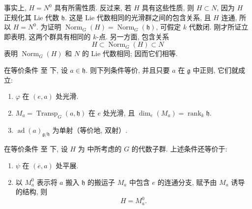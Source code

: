 事实上, \(H=N^0\) 具有所需性质. 反过来, 若 \(H\) 具有这些性质, 则 \(H\subset N\), 因为 \(H\) 正规化其 Lie 代数 \(\mathfrak h\). 这是 Lie 代数相同的光滑群之间的包含关系, 且 \(H\) 连通, 所以 \(H=N^0\). 为证明 \(\operatorname{Norm}_G(H)=\operatorname{Norm}_G(\mathfrak h)\), 可假定 \(k\) 代数闭. 刚才所证立即表明, 这两个群具有相同的 \(k\)-点. 另一方面, 包含关系
\[
  H\subset\operatorname{Norm}_G(H)\subset N
\]
表明 \(\operatorname{Norm}_G(H)\) 和 \(N\) 的 Lie 代数相同; 因而它们相等.

\begin{corollary}
在等价条件  至  下, 设 \(a\in\mathfrak h\). 则下列条件等价, 并且只要 \(a\) 在 \(\mathfrak g\) 中正则, 它们就成立:
\begin{enumerate}
  \item[(i)]
  \(\varphi\) 在 \((e,a)\) 处光滑.

  \item[(ii)]
  \(M_a=\operatorname{Transp}_G(a,\mathfrak h)\) 在 \(e\) 处光滑, 且 \(\dim_e(M_a)=\operatorname{rank}_k\mathfrak h\).

  \item[(iii)]
  \(\operatorname{ad}(a)_{\mathfrak g/\mathfrak h}\) 为单射（等价地, 双射）.
\end{enumerate}
在等价条件  至  下, 设 \(H\) 为 中所考虑的 \(G\) 的代数子群. 上述条件还等价于:
\begin{enumerate}
  \item[(iv)]
  \(\psi\) 在 \((\overline e,a)\) 处平展.

  \item[(v)]
  以 \(M_a^0\) 表示将 \(a\) 搬入 \(\mathfrak h\) 的搬运子 \(M_a\) 中包含 \(e\) 的连通分支, 赋予由 \(M_a\) 诱导的结构, 则
  \[
    H=M_a^0.
  \]
\end{enumerate}
\end{corollary}


